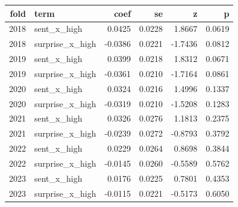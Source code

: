 \begin{tabular}{rlrrrr}
\toprule
fold & term & coef & se & z & p \\
\midrule
2018 & sent\_x\_high & 0.0425 & 0.0228 & 1.8667 & 0.0619 \\
2018 & surprise\_x\_high & -0.0386 & 0.0221 & -1.7436 & 0.0812 \\
2019 & sent\_x\_high & 0.0399 & 0.0218 & 1.8312 & 0.0671 \\
2019 & surprise\_x\_high & -0.0361 & 0.0210 & -1.7164 & 0.0861 \\
2020 & sent\_x\_high & 0.0324 & 0.0216 & 1.4996 & 0.1337 \\
2020 & surprise\_x\_high & -0.0319 & 0.0210 & -1.5208 & 0.1283 \\
2021 & sent\_x\_high & 0.0326 & 0.0276 & 1.1813 & 0.2375 \\
2021 & surprise\_x\_high & -0.0239 & 0.0272 & -0.8793 & 0.3792 \\
2022 & sent\_x\_high & 0.0229 & 0.0264 & 0.8698 & 0.3844 \\
2022 & surprise\_x\_high & -0.0145 & 0.0260 & -0.5589 & 0.5762 \\
2023 & sent\_x\_high & 0.0176 & 0.0225 & 0.7801 & 0.4353 \\
2023 & surprise\_x\_high & -0.0115 & 0.0221 & -0.5173 & 0.6050 \\
\bottomrule
\end{tabular}
